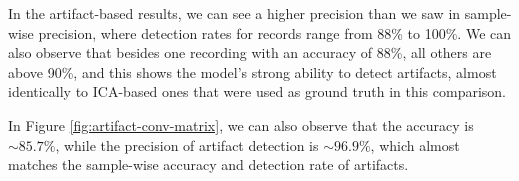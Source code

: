\documentclass[12pt,a4paper,titlepage,openany]{report}
\begin{document}
\begin{table}[ht]
\centering
{}
\caption{Artifact Evaluation per Recording}
\label{tab:artifact_eval}
\end{table}

In the artifact-based results, we can see a higher precision than we saw in sample-wise precision, where detection rates for records range from 88\% to 100\%. We can also observe that besides one recording with an accuracy of 88\%, all others are above 90\%, and this shows the model's strong ability to detect artifacts, almost identically to ICA-based ones that were used as ground truth in this comparison.

In Figure \ref{fig:artifact-conv-matrix}, we can also observe that the accuracy is \(\sim85.7\%\), while the precision of artifact detection is  \(\sim96.9\%\), which almost matches the sample-wise accuracy and detection rate of artifacts.
\end{document}
